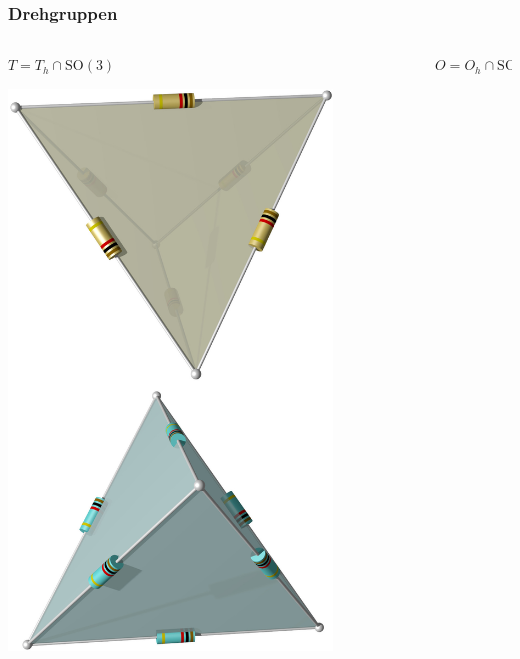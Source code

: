 %
%
%
\bgroup
\begin{frame}[t]
\setlength{\abovedisplayskip}{5pt}
\setlength{\belowdisplayskip}{5pt}
\frametitle{Drehgruppen}
\vspace{-20pt}
\begin{columns}[t,onlytextwidth]
\begin{column}{0.33\textwidth}
\begin{block}{$T = T_h \cap \operatorname{SO(3)}$}
\begin{center}
\includegraphics[width=0.8\textwidth]{../slides/6/punktgruppen/toi/T.jpg}
\end{center}
\end{block}
\end{column}
\begin{column}{0.33\textwidth}
\begin{block}{$O = O_h \cap \operatorname{SO(3)}$}

\end{block}
\end{column}
\end{columns}
\end{frame}
